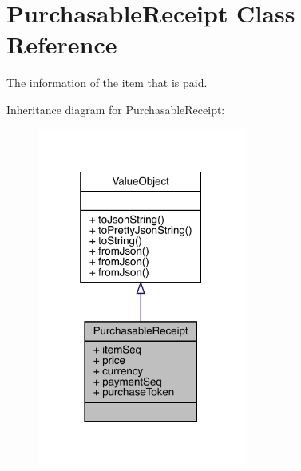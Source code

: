 \hypertarget{classcom_1_1toast_1_1android_1_1gamebase_1_1base_1_1purchase_1_1_purchasable_receipt}{}\section{Purchasable\+Receipt Class Reference}
\label{classcom_1_1toast_1_1android_1_1gamebase_1_1base_1_1purchase_1_1_purchasable_receipt}


The information of the item that is paid.  




Inheritance diagram for Purchasable\+Receipt\+:\nopagebreak
\begin{figure}[H]
\begin{center}
\leavevmode
\includegraphics[width=193pt]{classcom_1_1toast_1_1android_1_1gamebase_1_1base_1_1purchase_1_1_purchasable_receipt__inherit__graph}
\end{center}
\end{figure}


